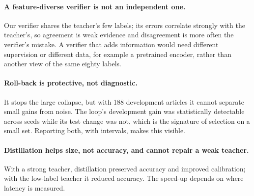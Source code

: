 \paragraph{A feature-diverse verifier is not an independent one.} Our verifier shares the teacher's few labels; its errors correlate strongly with the teacher's, so agreement is weak evidence and disagreement is more often the verifier's mistake. A verifier that adds information would need different supervision or different data, for example a pretrained encoder, rather than another view of the same eighty labels.

\paragraph{Roll-back is protective, not diagnostic.} It stops the large collapse, but with 188 development articles it cannot separate small gains from noise. The loop's development gain was statistically detectable across seeds while its test change was not, which is the signature of selection on a small set. Reporting both, with intervals, makes this visible.

\paragraph{Distillation helps size, not accuracy, and cannot repair a weak teacher.} With a strong teacher, distillation preserved accuracy and improved calibration; with the low-label teacher it reduced accuracy. The speed-up depends on where latency is measured.

